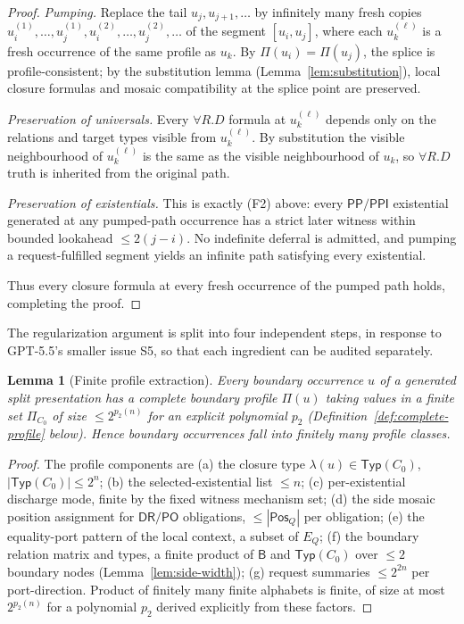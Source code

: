 \documentclass[11pt]{article}
\newtheorem{lemma}[theorem]{Lemma}
\newcommand{\Base}{\mathsf{B}}
\newcommand{\DR}{\mathsf{DR}}
\newcommand{\PO}{\mathsf{PO}}
\newcommand{\PP}{\mathsf{PP}}
\newcommand{\PPI}{\mathsf{PPI}}
\newcommand{\Typ}{\mathsf{Typ}}
\newcommand{\Pos}{\mathsf{Pos}}
\begin{document}
\begin{proof}
\emph{Pumping.}  Replace the tail $u_j,u_{j+1},\ldots$ by infinitely
many fresh copies $u_i^{(1)},\ldots,u_j^{(1)},u_i^{(2)},\ldots,u_j^{(2)},\ldots$
of the segment $[u_i,u_j]$, where each $u_k^{(\ell)}$ is a fresh
occurrence of the same profile as $u_k$.  By
$\Pi(u_i)=\Pi(u_j)$, the splice is profile-consistent; by the
substitution lemma (Lemma~\ref{lem:substitution}), local closure
formulas and mosaic compatibility at the splice point are
preserved.

\emph{Preservation of universals.}  Every $\forall R.D$ formula at
$u_k^{(\ell)}$ depends only on the relations and target types
visible from $u_k^{(\ell)}$.  By substitution the visible
neighbourhood of $u_k^{(\ell)}$ is the same as the visible
neighbourhood of $u_k$, so $\forall R.D$ truth is inherited from the
original path.

\emph{Preservation of existentials.}  This is exactly (F2) above:
every $\PP/\PPI$ existential generated at any pumped-path occurrence
has a strict later witness within bounded lookahead $\le 2(j-i)$.
No indefinite deferral is admitted, and pumping a request-fulfilled
segment yields an infinite path satisfying every existential.

Thus every closure formula at every fresh occurrence of the pumped
path holds, completing the proof.
\end{proof}

The regularization argument is split into four independent steps,
in response to GPT-5.5's smaller issue S5, so that each ingredient
can be audited separately.

\begin{lemma}[Finite profile extraction]\label{lem:profile-extraction}
Every boundary occurrence $u$ of a generated split presentation has
a complete boundary profile $\Pi(u)$ taking values in a finite set
$\Pi_{C_0}$ of size $\le 2^{p_2(n)}$ for an explicit polynomial
$p_2$ (Definition~\ref{def:complete-profile} below).  Hence
boundary occurrences fall into finitely many profile classes.
\end{lemma}

\begin{proof}
The profile components are (a) the closure type $\lambda(u)
\in\Typ(C_0)$, $|\Typ(C_0)|\le 2^n$; (b) the selected-existential
list $\le n$; (c) per-existential discharge mode, finite by the
fixed witness mechanism set; (d) the side mosaic position assignment
for $\DR/\PO$ obligations, $\le|\Pos_Q|$ per obligation; (e) the
equality-port pattern of the local context, a subset of
$E_Q$; (f) the boundary relation matrix and types, a finite product
of $\Base$ and $\Typ(C_0)$ over $\le 2$ boundary nodes
(Lemma~\ref{lem:side-width}); (g) request summaries $\le 2^{2n}$
per port-direction.  Product of finitely many finite alphabets is
finite, of size at most $2^{p_2(n)}$ for a polynomial $p_2$ derived
explicitly from these factors.
\end{proof}
\end{document}
